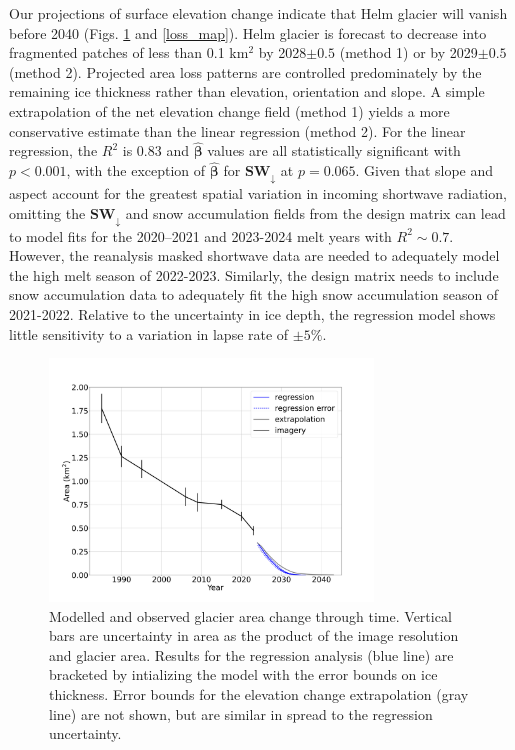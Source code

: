 \documentclass[annals,review,oneside]{igs}
\begin{document}
Our projections of surface elevation change indicate that Helm glacier will vanish before 2040 (Figs. \ref{area} and \ref{loss_map}). Helm glacier is forecast to decrease into fragmented patches of less than 0.1 km$^2$ by 2028$\pm0.5$ (method 1) or by 2029$\pm0.5$ (method 2). Projected area loss patterns are controlled predominately by the remaining ice thickness rather than elevation, orientation and slope. A simple extrapolation of the net elevation change field (method 1) yields a more conservative estimate than the linear regression (method 2). For the linear regression, the $R^2$ is 0.83 and $\hat{\boldsymbol{\beta}}$ values are all statistically significant with $p<0.001$, with the exception of $\hat{\boldsymbol{\beta}}$ for $\mathbf{SW_{\downarrow}}$ at $p=0.065$. Given that slope and aspect account for the greatest spatial variation in incoming shortwave radiation, omitting the $\mathbf{SW_{\downarrow}}$ and snow accumulation fields from the design matrix can lead to model fits for the  2020--2021 and 2023-2024 melt years with $R^2\sim0.7$. However, the reanalysis masked shortwave data are needed to adequately model the high melt season of 2022-2023. Similarly, the design matrix needs to include snow accumulation data to adequately fit the high snow accumulation season of 2021-2022. Relative to the uncertainty in ice depth, the regression model shows little sensitivity to a variation in lapse rate of $\pm 5\%$.

\begin{figure}[H]
\centering
\includegraphics[width=86mm,trim=2.5cm 2cm 2.5cm 2cm, clip=true]
{area_through_time.pdf}
\caption{Modelled and observed glacier area change through time. Vertical bars are uncertainty in area as the product of the image resolution and glacier area. Results for the regression analysis (blue line) are bracketed by intializing the model with the error bounds on ice thickness. Error bounds for the elevation change extrapolation (gray line) are not shown, but are similar in spread to the regression uncertainty.}
\label{area}
\end{figure}
\end{document}
